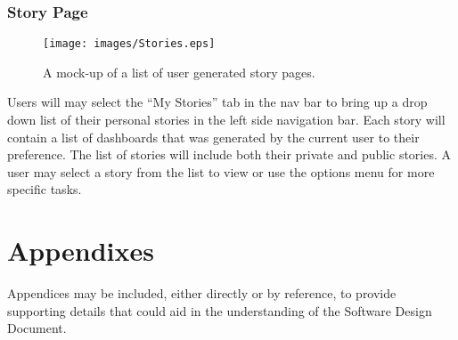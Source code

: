 \documentclass[journal,10pt,onecolumn,compsoc]{IEEEtran}
\begin{document}
    \subsubsection{Story Page}
    \begin{figure}[H]
        \centering
        \texttt{[image: images/Stories.eps]}
        \caption{A mock-up of a list of user generated story pages.}
    \end{figure}
	Users will may select the ``My Stories'' tab in the nav bar to bring up a drop down list of their personal stories in the left side navigation bar.
	Each story will contain a list of dashboards that was generated by the current user to their preference. 
	The list of stories will include both their private and public stories.
	A user may select a story from the list to view or use the options menu for more specific tasks.
	
	
    \section{Appendixes}
    Appendices may be included, either directly or by reference, to provide supporting details
    that could aid in the understanding of the Software Design Document. 
    
    
\end{document}
